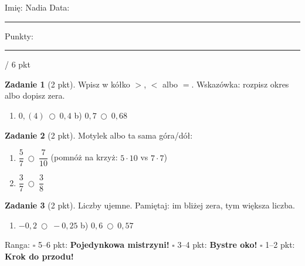 \documentclass[11pt,a4paper]{article}
\begin{document}

\vspace{0.2em}
Imię: Nadia \hfill Data: \rule{3cm}{0.4pt} \hfill Punkty: \rule{1.2cm}{0.4pt} / 6 pkt

\vspace{0.6em}
\textbf{Zadanie 1} (2 pkt). Wpisz w kółko $>$, $<$ albo $=$. Wskazówka: rozpisz okres albo dopisz zera.
\begin{enumerate}[label=\alph*), leftmargin=*, itemsep=6pt]
  \item $0{,}(4)\ \bigcirc\ 0{,}4$ \hspace{1cm} b) $0{,}7\ \bigcirc\ 0{,}68$
\end{enumerate}

\textbf{Zadanie 2} (2 pkt). Motylek albo ta sama góra/dół:
\begin{enumerate}[label=\alph*), leftmargin=*, itemsep=6pt]
  \item $\dfrac{5}{7}\ \bigcirc\ \dfrac{7}{10}$ \hspace{1cm} (pomnóż na krzyż: $5\cdot 10$ vs $7\cdot 7$)
  \item $\dfrac{3}{7}\ \bigcirc\ \dfrac{3}{8}$
\end{enumerate}

\textbf{Zadanie 3} (2 pkt). Liczby ujemne. Pamiętaj: im bliżej zera, tym większa liczba.
\begin{enumerate}[label=\alph*), leftmargin=*, itemsep=6pt]
  \item $-0{,}2\ \bigcirc\ -0{,}25$ \hspace{1cm} b) $0{,}6\ \bigcirc\ 0{,}57$
\end{enumerate}

\vspace{0.6em}
\begin{tcolorbox}[colback=white, colframe=cel, boxrule=0.6pt, arc=2pt]
Ranga: \quad $\square$ 5--6 pkt: \textbf{Pojedynkowa mistrzyni!} \quad $\square$ 3--4 pkt: \textbf{Bystre oko!} \quad $\square$ 1--2 pkt: \textbf{Krok do przodu!}
\end{tcolorbox}
\end{document}
